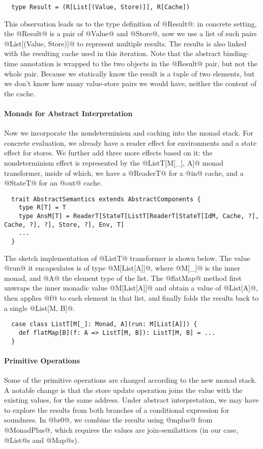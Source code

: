 \begin{lstlisting}
  type Result = (R[List[(Value, Store)]], R[Cache])
\end{lstlisting}

This observation leads us to the type definition of @Result@: in concrete setting,
the @Result@ is a pair of @Value@ and @Store@, now we use a list of such pairs
@List[(Value, Store)]@ to represent multiple results. The results is also linked
with the resulting cache used in this iteration.
Note that the abstract binding-time annotation is wrapped to the two objects in
the @Result@ pair, but not the whole pair. Because we statically know the result
is a tuple of two elements, but we don't know how many value-store pairs we
would have, neither the content of the cache.

\paragraph{Monads for Abstract Interpretation} Now we incorporate the
nondeterminism and caching into the monad stack. For concrete evaluation, we
already have a reader effect for environments and a state effect for stores. We
further add three more effects based on it: the nondeterminism effect is
represented by the @ListT[M[_], A]@ monad transformer, inside of which, we have
a @ReaderT@ for a @in@ cache, and a @StateT@ for an @out@ cache. 

\begin{lstlisting}
  trait AbstractSemantics extends AbstractComponents {
    type R[T] = T
    type AnsM[T] = ReaderT[StateT[ListT[ReaderT[StateT[IdM, Cache, ?], Cache, ?], ?], Store, ?], Env, T]
    ...
  }
\end{lstlisting}

The sketch implementation of @ListT@ transformer is shown below. The value @run@
it encapsulates is of type @M[List[A]]@, where @M[_]@ is the inner monad, and
@A@ the element type of the list. The @flatMap@ method first unwraps the inner
monadic value @M[List[A]]@ and obtain a value of @List[A]@, then applies @f@ to
each element in that list, and finally folds the results back to a single
@List[M, B]@.

\begin{lstlisting}
  case class ListT[M[_]: Monad, A](run: M[List[A]]) {
    def flatMap[B](f: A => ListT[M, B]): ListT[M, B] = ...
  }
\end{lstlisting}

\paragraph{Primitive Operations} Some of the primitive operations are changed
according to the new monad stack. A notable change is that the store update
operation joins the value with the existing values, for the same address. Under
abstract interpretation, we may have to explore the results from both branches
of a conditional expression for soundness. In @br0@, we combine the results
using @mplus@ from @MonadPlus@, which requires the values are join-semilattices
(in our case, @List@s and @Map@s).

